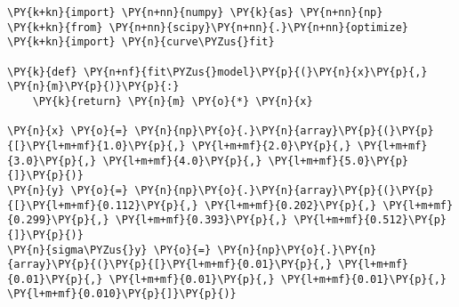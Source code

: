 \begin{Verbatim}[label=\makebox{\href{https://bitbucket.org/lbaldini/statnotes/src/master/snippets/absolute\_sigma.py}{https://bitbucket.org/.../absolute\_sigma.py}},commandchars=\\\{\}]
\PY{k+kn}{import} \PY{n+nn}{numpy} \PY{k}{as} \PY{n+nn}{np}
\PY{k+kn}{from} \PY{n+nn}{scipy}\PY{n+nn}{.}\PY{n+nn}{optimize} \PY{k+kn}{import} \PY{n}{curve\PYZus{}fit}

\PY{k}{def} \PY{n+nf}{fit\PYZus{}model}\PY{p}{(}\PY{n}{x}\PY{p}{,} \PY{n}{m}\PY{p}{)}\PY{p}{:}
    \PY{k}{return} \PY{n}{m} \PY{o}{*} \PY{n}{x}

\PY{n}{x} \PY{o}{=} \PY{n}{np}\PY{o}{.}\PY{n}{array}\PY{p}{(}\PY{p}{[}\PY{l+m+mf}{1.0}\PY{p}{,} \PY{l+m+mf}{2.0}\PY{p}{,} \PY{l+m+mf}{3.0}\PY{p}{,} \PY{l+m+mf}{4.0}\PY{p}{,} \PY{l+m+mf}{5.0}\PY{p}{]}\PY{p}{)}
\PY{n}{y} \PY{o}{=} \PY{n}{np}\PY{o}{.}\PY{n}{array}\PY{p}{(}\PY{p}{[}\PY{l+m+mf}{0.112}\PY{p}{,} \PY{l+m+mf}{0.202}\PY{p}{,} \PY{l+m+mf}{0.299}\PY{p}{,} \PY{l+m+mf}{0.393}\PY{p}{,} \PY{l+m+mf}{0.512}\PY{p}{]}\PY{p}{)}
\PY{n}{sigma\PYZus{}y} \PY{o}{=} \PY{n}{np}\PY{o}{.}\PY{n}{array}\PY{p}{(}\PY{p}{[}\PY{l+m+mf}{0.01}\PY{p}{,} \PY{l+m+mf}{0.01}\PY{p}{,} \PY{l+m+mf}{0.01}\PY{p}{,} \PY{l+m+mf}{0.01}\PY{p}{,} \PY{l+m+mf}{0.010}\PY{p}{]}\PY{p}{)}


\end{Verbatim}
